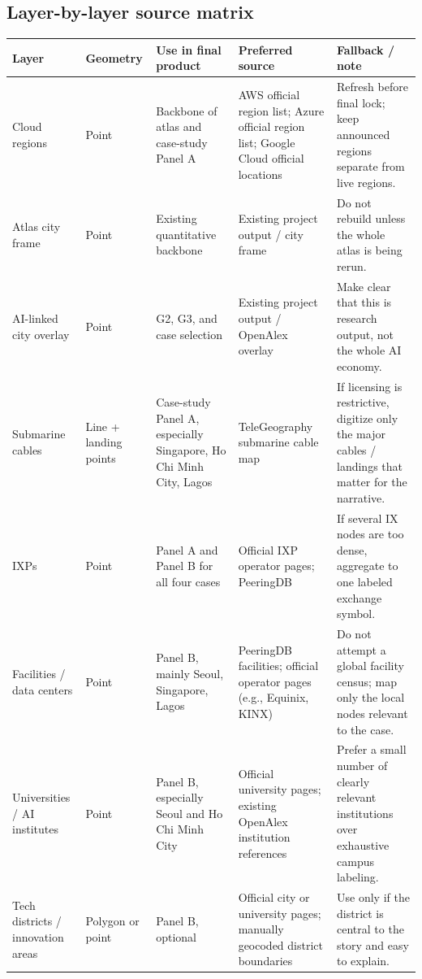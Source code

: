 \documentclass[11pt]{article}
\begin{document}
\subsection{Layer-by-layer source matrix}

\begin{longtable}{P{0.18\textwidth} P{0.12\textwidth} P{0.2\textwidth} P{0.23\textwidth} P{0.2\textwidth}}
\toprule
\textbf{Layer} & \textbf{Geometry} & \textbf{Use in final product} & \textbf{Preferred source} & \textbf{Fallback / note} \\
\midrule
\endhead
Cloud regions & Point & Backbone of atlas and case-study Panel A & AWS official region list; Azure official region list; Google Cloud official locations & Refresh before final lock; keep announced regions separate from live regions. \\
Atlas city frame & Point & Existing quantitative backbone & Existing project output / city frame & Do not rebuild unless the whole atlas is being rerun. \\
AI-linked city overlay & Point & G2, G3, and case selection & Existing project output / OpenAlex overlay & Make clear that this is research output, not the whole AI economy. \\
Submarine cables & Line + landing points & Case-study Panel A, especially Singapore, Ho Chi Minh City, Lagos & TeleGeography submarine cable map & If licensing is restrictive, digitize only the major cables / landings that matter for the narrative. \\
IXPs & Point & Panel A and Panel B for all four cases & Official IXP operator pages; PeeringDB & If several IX nodes are too dense, aggregate to one labeled exchange symbol. \\
Facilities / data centers & Point & Panel B, mainly Seoul, Singapore, Lagos & PeeringDB facilities; official operator pages (e.g., Equinix, KINX) & Do not attempt a global facility census; map only the local nodes relevant to the case. \\
Universities / AI institutes & Point & Panel B, especially Seoul and Ho Chi Minh City & Official university pages; existing OpenAlex institution references & Prefer a small number of clearly relevant institutions over exhaustive campus labeling. \\
Tech districts / innovation areas & Polygon or point & Panel B, optional & Official city or university pages; manually geocoded district boundaries & Use only if the district is central to the story and easy to explain. \\

\end{longtable}
\end{document}

